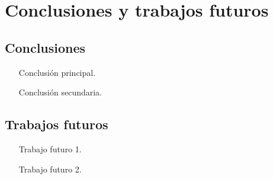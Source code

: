 
\chapter{Conclusiones y trabajos futuros}
\label{ch:conclusion}

\section{Conclusiones}
\begin{itemize}
  \item [Conclusión principal.]
  \item [Conclusión secundaria.]
\end{itemize}

\section{Trabajos futuros}
\begin{itemize}
  \item [Trabajo futuro 1.]
  \item [Trabajo futuro 2.]
\end{itemize}
